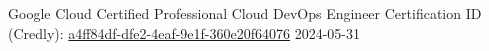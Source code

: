\awarditem
{Google Cloud Certified Professional Cloud DevOps Engineer}
{\companygoogle}
{Certification ID (Credly): \href{https://www.credly.com/badges/a4ff84df-dfe2-4eaf-9e1f-360e20f64076}{a4ff84df-dfe2-4eaf-9e1f-360e20f64076}}
{2024-05-31}